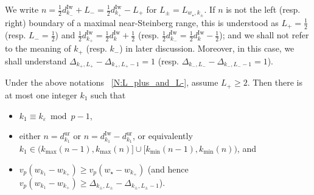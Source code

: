 \begin{notation}
    \label{N:L_plus_and_L-}
    We write $n = \frac 12 d_{k_-}^{\mathrm{Iw}}+ L_- = \frac 12 d_{k_+}^{\mathrm{Iw}}- L_+$ for $L_\pm= L_{w_\star, k_\pm}$. If $n$ is not the left (resp. right) boundary of a maximal near-Steinberg range, this is understood as $L_+ = \frac 12$ (resp. $L_- = \frac 12$) and $\frac 12d_{k_+}^{\mathrm{Iw}}= \frac 12 d_k^{\mathrm{Iw}}+\frac 12$ (resp. $\frac 12d_{k_-}^{\mathrm{Iw}}= \frac 12 d_k^{\mathrm{Iw}}-\frac 12$); and we shall not refer to the meaning of $k_+$ (resp. $k_-$) in later discussion. Moreover, in this case, we shall understand $\Delta_{k_+, L_+} - \Delta_{k_+, L_+-1} = 1$ (resp. $\Delta_{k_-, L_-} - \Delta_{k_-, L_--1} = 1$).
\end{notation}

\begin{lemma}
    \label{L:a_technical_lemma_in_the_proof_of_statements_c_d_part1}
    Under the above notations ~\ref{N:L_plus_and_L-}, assume $L_+\geq 2$. Then there is at most one integer $k_1$ such that
    \begin{itemize}
    \item $k_1 \equiv k_\varepsilon \bmod p-1$,
    \item either $n = d_{k_1}^{\mathrm{ur}}$ or $n = d_{k_1}^{\mathrm{Iw}}- d_{k_1}^{\mathrm{ur}}$, or equivalently $k_{1} \in \big( k_{\max}(n-1), k_{\max}(n)\big] \cup \big[ k_{\min}(n-1), k_{\min}(n)\big)$,
    and
    \item $v_p(w_{k_1} - w_{k_+}) \geq v_p(w_\star - w_{k_+})$ (and hence $v_p(w_{k_1} - w_{k_+}) \geq \Delta_{k_\pm, L_\pm}-\Delta_{k_\pm,L_\pm -1}$).
    \end{itemize}
\end{lemma}

